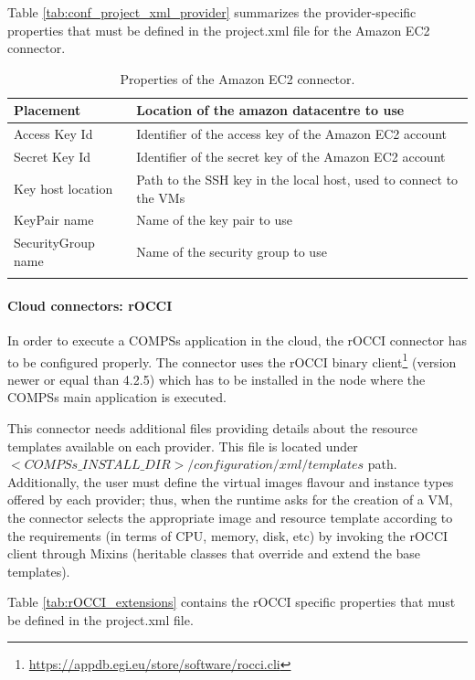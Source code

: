 Table \ref{tab:conf_project_xml_provider} summarizes the provider-specific properties that must be 
defined in the project.xml file for the Amazon EC2 connector.

\begin{longtable}{| p{} | p{} |}
\hline
{\bf Placement }    &   Location of the amazon datacentre to use \\
\hline
Access Key Id       &   Identifier of the access key of the Amazon EC2 account \\
\hline
Secret Key Id       &   Identifier of the secret key of the Amazon EC2 account \\
\hline
Key host location   &   Path to the SSH key in the local host, used to connect to the VMs \\
\hline
KeyPair name        &   Name of the key pair to use \\
\hline
SecurityGroup name  &   Name of the security group to use \\
\hline
\caption{Properties of the Amazon EC2 connector.}
\label{tab:ec2_connector_properties}
\end{longtable}

\paragraph{Cloud connectors: rOCCI}
In order to execute a COMPSs application in the cloud, the rOCCI connector has to be configured properly. 
The connector uses the rOCCI binary client\footnote{\url{https://appdb.egi.eu/store/software/rocci.cli}} 
(version newer or equal than 4.2.5) which has to be installed in the node where the COMPSs main 
application is executed.

This connector needs additional files providing details about the resource templates available on 
each provider. This file is located under $<COMPSs\_INSTALL\_DIR>/configuration/xml/templates$ path. 
Additionally, the user must define the virtual images flavour and instance types offered by each provider; 
thus, when the runtime asks for the creation of a VM, the connector selects the appropriate image and 
resource template according to the requirements (in terms of CPU, memory, disk, etc) by invoking the 
rOCCI client through Mixins (heritable classes that override and extend the base templates).

Table \ref{tab:rOCCI_extensions} contains the rOCCI specific properties that must be defined in the 
project.xml file.


